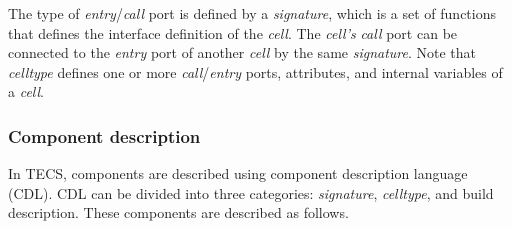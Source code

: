 \documentclass[conference]{IEEEtran/IEEEtran}
\begin{document}
The type of {\it entry}/{\it call} port is defined by a {\it signature}, which is a set of functions that defines the interface definition of the {\it cell}.
The {\it cell's} {\it call} port can be connected to the {\it entry} port of another {\it cell} by the same {\it signature}.
Note that {\it celltype} defines one or more {\it call}/{\it entry} ports, attributes, and internal variables of a {\it cell}.

\subsubsection{Component description}

In TECS, components are described using component description language (CDL).
CDL can be divided into three categories: {\it signature}, {\it celltype}, and build description.
These components are described as follows.
\end{document}
